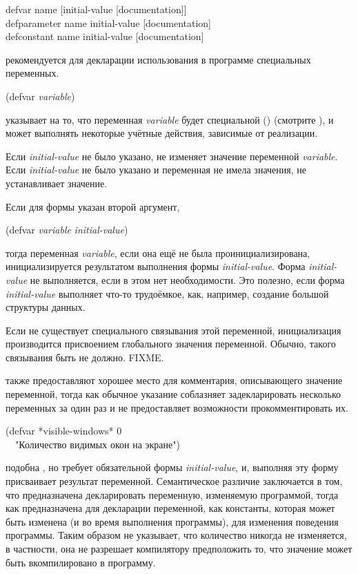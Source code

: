 \begin{defmac}
defvar name [initial-value [documentation]] \\
defparameter name initial-value [documentation] \\
defconstant name initial-value [documentation]

 рекомендуется для декларации использования в программе специальных
переменных.
\begin{lisp}
(defvar \emph{variable})
\end{lisp}
указывает на то, что переменная \emph{variable} будет специальной
() (смотрите ), и может выполнять некоторые учётные
действия, зависимые от реализации.

Если \emph{initial-value} не было указано,  не изменяет значение
переменной \emph{variable}. 
Если \emph{initial-value} не было указано и переменная не имела значения,
 не устанавливает значение.

Если для формы указан второй аргумент,
\begin{lisp}
(defvar \emph{variable} \emph{initial-value})
\end{lisp}
тогда переменная \emph{variable}, если она ещё не была проинициализирована,
инициализируется результатом выполнения формы \emph{initial-value}. Форма
\emph{initial-value} не выполняется, если в этом нет необходимости. Это
полезно, если форма \emph{initial-value} выполняет что-то
трудоёмкое, как, например, создание большой структуры данных.

Если не существует специального связывания этой переменной, инициализация
производится присвоением глобального значения переменной. 
Обычно, такого связывания быть не должно. FIXME.

 также предоставляют хорошее место для комментария, описывающего
значение переменной, тогда как обычное  указание соблазняет
задекларировать несколько переменных за один раз и не предоставляет возможности
прокомментировать их.
\begin{lisp}
(defvar *visible-windows* 0 \\
~~"Количество видимых окон на экране")
\end{lisp}

 подобна , но  требует
обязательной формы \emph{initial-value}, и, выполняя эту форму присваивает
результат переменной. Семантическое различие заключается в том, что 
 предназначена декларировать переменную, изменяемую программой,
тогда как  предназначена для декларации переменной, как
константы, которая может быть изменена (и во время выполнения программы), для
изменения поведения программы. Таким образом  не указывает,
что количество никогда не изменяется, в частности, она не разрешает 
компилятору предположить то, что значение может быть вкомпилировано в
программу.


\end{defmac}
